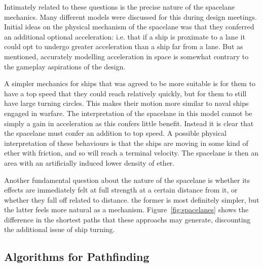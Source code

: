 Intimately related to these questions is the precise nature of the spacelane mechanics. Many different models were discussed for this during design meetings. Initial ideas on the physical mechanism of the spacelane was that they conferred an additional optional acceleration: i.e. that if a ship is proximate to a lane it could opt to undergo greater acceleration than a ship far from a lane. But as mentioned, accurately modelling acceleration in space is somewhat contrary to the gameplay aspirations of the design. 

A simpler mechanics for ships that was agreed to be more suitable is for them to have a top speed that they could reach relatively quickly, but for them to still have large turning circles. This makes their motion more similar to naval ships engaged in warfare. The interpretation of the spacelane in this model cannot be simply a gain in acceleration as this confers little benefit. Instead it is clear that the spacelane must confer an addition to top speed. A possible physical interpretation of these behaviours is that the ships are moving in some kind of ether with friction, and so will reach a terminal velocity. The spacelane is then an area with an  artificially induced lower density of ether.

Another fundamental question about the nature of the spacelane is whether its effects are immediately felt at full strength at a certain distance from it, or whether they fall off related to distance. the former is most definitely simpler, but the latter feels more natural as a mechanism. Figure~\ref{fig:spacelanes} shows the difference in the shortest paths that these approachs may generate, discounting the additional issue of ship turning.

\subsection{Algorithms for Pathfinding}

